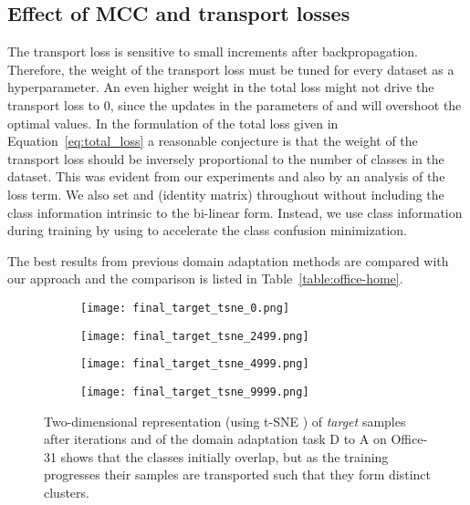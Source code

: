 \documentclass[10pt,twocolumn,letterpaper]{article}
\begin{document}
\subsection{Effect of MCC and transport losses}

The transport loss is sensitive to small increments after backpropagation. Therefore, the weight of the transport loss must be tuned for every dataset as a hyperparameter. An even higher weight in the total loss might not drive the transport loss to 0, since the updates in the parameters of  and  will overshoot the optimal values. 
In the formulation of the total loss given in Equation~\ref{eq:total_loss} a reasonable conjecture is that the weight of the transport loss should be inversely proportional to the number of classes in the dataset. This was evident from our experiments and also by an analysis of the loss term. We also set  and   (identity matrix) throughout without including the class information intrinsic to the bi-linear form. Instead, we use class information during training by using  to accelerate the class confusion minimization. 

The best results from previous domain adaptation methods are compared with our approach and the comparison is listed in Table~\ref{table:office-home}.

\begin{figure*}
     \centering
     \begin{subfigure}[b]{0.22\textwidth}
         \centering
         \texttt{[image: final\_target\_tsne\_0.png]}
         \caption{}
         \label{fig:iter0}
     \end{subfigure}
     \hspace{1em}
     \begin{subfigure}[b]{0.22\textwidth}
         \centering
         \texttt{[image: final\_target\_tsne\_2499.png]}
         \caption{}
         \label{fig:iter2500}
     \end{subfigure}
     \hspace{1em}
     \begin{subfigure}[b]{0.22\textwidth}
         \centering
         \texttt{[image: final\_target\_tsne\_4999.png]}
         \caption{}
         \label{fig:iter5000}
     \end{subfigure}
     \hspace{1em}
     \begin{subfigure}[b]{0.22\textwidth}
         \centering
         \texttt{[image: final\_target\_tsne\_9999.png]}
         \caption{}
         \label{fig:iter10000}
     \end{subfigure}
        \caption{Two-dimensional representation (using t-SNE \cite{tsne}) of \emph{target} samples after iterations  and  of the domain adaptation task D to A on Office-31 shows that the classes initially overlap, but as the training progresses their samples are transported such that they form distinct clusters.}
        \label{fig:tsne}
\end{figure*}
\end{document}
